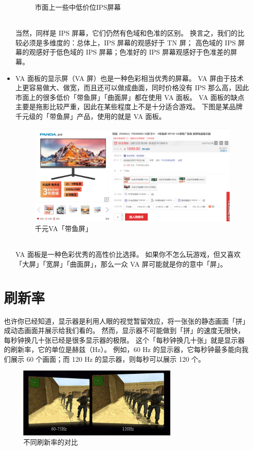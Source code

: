 \begin{itemize}
\begin{figure}[htb!]
      \caption{市面上一些中低价位IPS屏幕}
      \label{IPS_at_Low_Price}
    \end{figure}\\
    当然，同样是 IPS 屏幕，它们仍然有色域和色准的区别。
    换言之，我们的比较必须是多维度的：总体上，IPS 屏幕的观感好于 TN 屏；
    高色域的 IPS 屏幕的观感好于低色域的 IPS 屏幕；色准好的 IPS 屏幕观感好于色准差的屏幕。
  \item VA 面板的显示屏（VA 屏）也是一种色彩相当优秀的屏幕。
    VA 屏由于技术上更容易做大、做宽，而且还可以做成曲面，同时价格没有 IPS 那么高，因此市面上的很多低价「带鱼屏」「曲面屏」都在使用 VA 面板。
    VA 面板的缺点主要是拖影比较严重，因此在某些程度上不是十分适合游戏。
    下图是某品牌千元级的「带鱼屏」产品，使用的就是 VA 面板。
    \begin{figure}[htb!]
      \centering
      \includegraphics[width=11cm]{assets/VA_at_Low_Price.png}
      \caption{千元VA「带鱼屏」}
      \label{VA_at_Low_Price}
    \end{figure}\\
    VA 面板是一种色彩优秀的高性价比选择。
    如果你不怎么玩游戏，但又喜欢「大屏」「宽屏」「曲面屏」，那么一众 VA 屏可能就是你的意中「屏」。
\end{itemize}

\section{刷新率}

也许你已经知道，显示器是利用人眼的视觉暂留效应，将一张张的静态画面「拼」成动态画面并展示给我们看的。
然而，显示器不可能做到「拼」的速度无限快，每秒钟换几十张已经是很多显示器的极限。
这个「每秒钟换几十张」就是显示器的刷新率，它的单位是赫兹（Hz）。
例如，60 Hz 的显示器，它每秒钟最多能向我们展示 60 个画面；而 120 Hz 的显示器，则每秒可以展示 120 个。

\begin{figure}[htb!]
  \centering
  \includegraphics[width=8cm]{assets/60Hz_vs_120Hz.png}
  \caption{不同刷新率的对比}
  \label{60Hz_vs_120Hz}
\end{figure}

